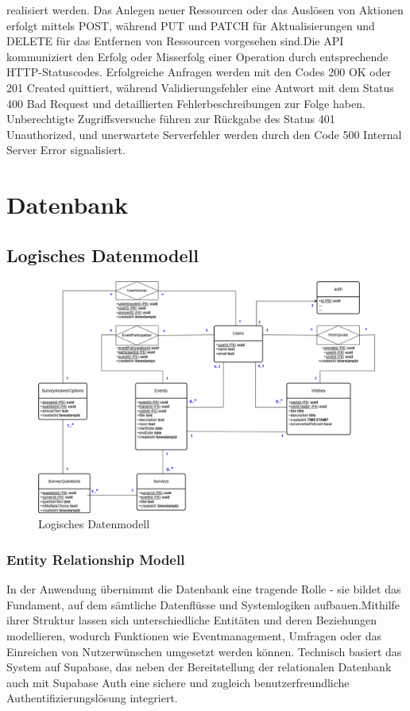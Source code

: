 \documentclass[a4paper,12pt]{article}
\begin{document}
realisiert werden. Das Anlegen neuer Ressourcen oder das Auslösen von Aktionen erfolgt mittels POST, während PUT und PATCH für Aktualisierungen und DELETE für das Entfernen von Ressourcen vorgesehen sind.\newline \newline Die API kommuniziert den Erfolg oder Misserfolg einer Operation durch entsprechende HTTP-Statuscodes. Erfolgreiche Anfragen werden mit den Codes 200 OK oder 201 Created quittiert, während Validierungsfehler eine Antwort mit dem Status 400 Bad Request und detaillierten Fehlerbeschreibungen zur Folge haben. Unberechtigte Zugriffsversuche führen zur Rückgabe des Status 401 Unauthorized, und unerwartete Serverfehler werden durch den Code 500 Internal Server Error signalisiert.
\newpage
\section{Datenbank}
\subsection{Logisches Datenmodell}
\begin{figure}[h]
  \centering
  \includegraphics[width=1\textwidth]{Abbildungen/logisches_datenmodell.png}
  \caption{Logisches Datenmodell}
  \label{fig:logisches_datenmodell}
\end{figure}
\subsubsection{Entity Relationship Modell}
In der Anwendung übernimmt die Datenbank eine tragende Rolle - sie bildet das Fundament, auf dem sämtliche Datenflüsse und Systemlogiken aufbauen.Mithilfe ihrer Struktur lassen sich unterschiedliche Entitäten und deren Beziehungen modellieren, wodurch Funktionen wie Eventmanagement, Umfragen oder das Einreichen von Nutzerwünschen umgesetzt werden können. Technisch basiert das System auf Supabase, das neben der Bereitstellung der relationalen Datenbank auch mit Supabase Auth eine sichere und zugleich benutzerfreundliche Authentifizierungslösung integriert.
\end{document}
